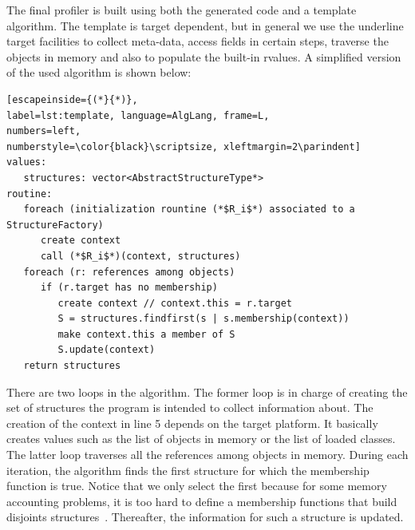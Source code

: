 {The final profiler is built using both the generated code and a template algorithm.
The template is target dependent, but in general we use the underline target facilities to collect meta-data, access fields in certain steps, traverse the objects in memory and also to populate the built-in rvalues.
A simplified version of the used algorithm is shown below:
\begin{lstlisting}[escapeinside={(*}{*)},
label=lst:template, language=AlgLang, frame=L,
numbers=left,
numberstyle=\color{black}\scriptsize, xleftmargin=2\parindent]
values:
   structures: vector<AbstractStructureType*>
routine:
   foreach (initialization rountine (*$R_i$*) associated to a StructureFactory)
      create context
	  call (*$R_i$*)(context, structures)
   foreach (r: references among objects)
      if (r.target has no membership)
         create context // context.this = r.target
         S = structures.findfirst(s | s.membership(context))
         make context.this a member of S
         S.update(context)
   return structures 
\end{lstlisting}
There are two loops in the algorithm. 
The former loop is in charge of creating the set of structures the program is intended to collect information about.
The creation of the context in line 5 depends on the target platform.
It basically creates values such as the list of objects in memory or the list of loaded classes.
The latter loop traverses all the references among objects in memory.
During each iteration, the algorithm finds the first structure for which the membership function is true.
Notice that we only select the first because for some memory accounting problems, it is too hard to define a membership functions that build disjoints structures~\cite{dsn/09/geoffray/ijvm,Attouchi:2014:MMM:2602458.2602467}.
Thereafter, the information for such a structure is updated.


}
